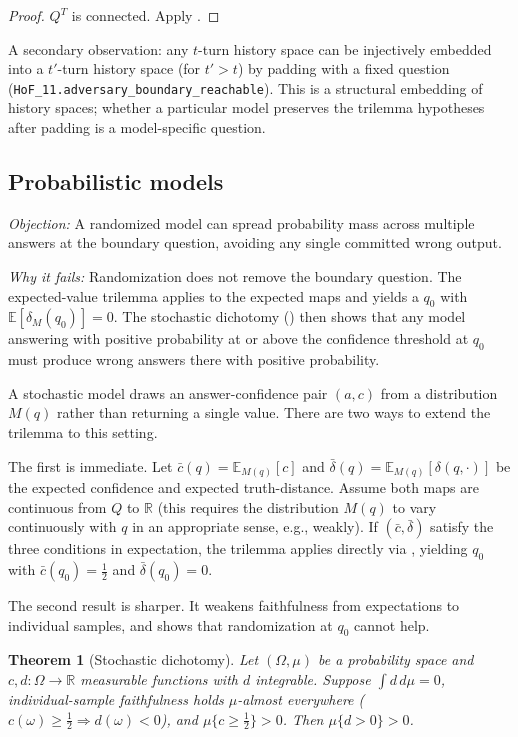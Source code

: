 \documentclass[10pt]{article}
\newtheorem{theorem}{Theorem}[section]
\newcommand{\R}{\mathbb{R}}
\begin{document}
\begin{proof}
$Q^T$ is connected. Apply .
\end{proof}

A secondary observation: any $t$-turn history space can be injectively embedded
into a $t'$-turn history space (for $t' > t$) by padding with a fixed
question (\texttt{HoF\_11.adversary\_boundary\_reachable}). This is a
structural embedding of history spaces; whether a particular model preserves
the trilemma hypotheses after padding is a model-specific question.

\subsection{Probabilistic models}
\label{sec:stochastic}

\textit{Objection:} A randomized model can spread probability mass across
multiple answers at the boundary question, avoiding any single committed
wrong output.

\textit{Why it fails:} Randomization does not remove the boundary question.
The expected-value trilemma applies to the expected maps and yields a $q_0$
with $\mathbb{E}[\delta_M(q_0)] = 0$. The stochastic dichotomy
() then shows that any model answering with positive
probability at or above the confidence threshold at $q_0$ must produce
wrong answers there with positive
probability.

A stochastic model draws an answer-confidence pair $(a, c)$ from a
distribution $M(q)$ rather than returning a single value. There are two
ways to extend the trilemma to this setting.

The first is immediate. Let $\bar{c}(q) = \mathbb{E}_{M(q)}[c]$ and
$\bar{\delta}(q) = \mathbb{E}_{M(q)}[\delta(q,\cdot)]$ be the expected
confidence and expected truth-distance. Assume both maps are continuous
from $Q$ to $\R$ (this requires the distribution $M(q)$ to vary
continuously with $q$ in an appropriate sense, e.g., weakly). If
$(\bar{c}, \bar{\delta})$ satisfy the three conditions in expectation,
the trilemma applies directly via , yielding $q_0$
with $\bar{c}(q_0) = \tfrac{1}{2}$ and $\bar{\delta}(q_0) = 0$.

The second result is sharper. It weakens faithfulness from expectations
to individual samples, and shows that randomization at $q_0$ cannot help.

\begin{theorem}[Stochastic dichotomy]
\label{thm:dichotomy}
Let $(\Omega, \mu)$ be a probability space and $c, d\colon \Omega \to \R$
measurable functions with $d$ integrable. Suppose $\int d\,d\mu = 0$,
individual-sample faithfulness holds
$\mu$-almost everywhere ($c(\omega) \geq \tfrac{1}{2} \Rightarrow d(\omega)
< 0$), and $\mu\{c \geq \tfrac{1}{2}\} > 0$. Then $\mu\{d > 0\} > 0$.
\end{theorem}
\end{document}
